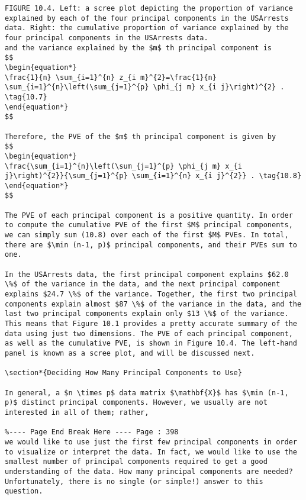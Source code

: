 \documentclass[10pt]{article}
\begin{document}
\begin{verbatim}
FIGURE 10.4. Left: a scree plot depicting the proportion of variance explained by each of the four principal components in the USArrests data. Right: the cumulative proportion of variance explained by the four principal components in the USArrests data.
and the variance explained by the $m$ th principal component is
$$
\begin{equation*}
\frac{1}{n} \sum_{i=1}^{n} z_{i m}^{2}=\frac{1}{n} \sum_{i=1}^{n}\left(\sum_{j=1}^{p} \phi_{j m} x_{i j}\right)^{2} . \tag{10.7}
\end{equation*}
$$

Therefore, the PVE of the $m$ th principal component is given by
$$
\begin{equation*}
\frac{\sum_{i=1}^{n}\left(\sum_{j=1}^{p} \phi_{j m} x_{i j}\right)^{2}}{\sum_{j=1}^{p} \sum_{i=1}^{n} x_{i j}^{2}} . \tag{10.8}
\end{equation*}
$$

The PVE of each principal component is a positive quantity. In order to compute the cumulative PVE of the first $M$ principal components, we can simply sum (10.8) over each of the first $M$ PVEs. In total, there are $\min (n-1, p)$ principal components, and their PVEs sum to one.

In the USArrests data, the first principal component explains $62.0 \%$ of the variance in the data, and the next principal component explains $24.7 \%$ of the variance. Together, the first two principal components explain almost $87 \%$ of the variance in the data, and the last two principal components explain only $13 \%$ of the variance. This means that Figure 10.1 provides a pretty accurate summary of the data using just two dimensions. The PVE of each principal component, as well as the cumulative PVE, is shown in Figure 10.4. The left-hand panel is known as a scree plot, and will be discussed next.

\section*{Deciding How Many Principal Components to Use}

In general, a $n \times p$ data matrix $\mathbf{X}$ has $\min (n-1, p)$ distinct principal components. However, we usually are not interested in all of them; rather,

%---- Page End Break Here ---- Page : 398
we would like to use just the first few principal components in order to visualize or interpret the data. In fact, we would like to use the smallest number of principal components required to get a good understanding of the data. How many principal components are needed? Unfortunately, there is no single (or simple!) answer to this question.


\end{verbatim}
\end{document}
